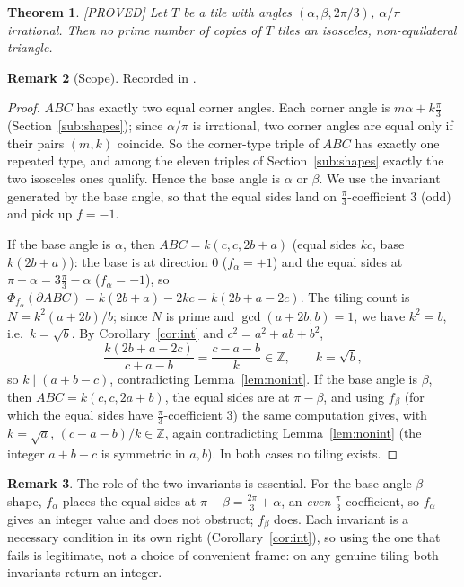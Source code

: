 \documentclass[11pt,reqno]{amsart}
\theoremstyle{plain}
\newtheorem{theorem}{Theorem}
\theoremstyle{definition}
\newtheorem{remark}[theorem]{Remark}
\newcommand{\Z}{\mathbb{Z}}
\newcommand{\lab}[1]{\hfill\textnormal{\footnotesize\textsc{[#1]}}}
\begin{document}
\begin{theorem}\label{thm:iso}\lab{PROVED}
Let $T$ be a tile with angles $(\alpha,\beta,2\pi/3)$, $\alpha/\pi$ irrational. Then no prime number
of copies of $T$ tiles an isosceles, non-equilateral triangle.
\end{theorem}

\begin{remark}[Scope]\label{rem:incomm}
Recorded in \cite{Obstructions}.
\end{remark}

\begin{proof}
$ABC$ has exactly two equal corner angles. Each corner angle is $m\alpha+k\frac\pi3$
(Section~\ref{sub:shapes}); since $\alpha/\pi$ is irrational, two corner angles are equal only if
their pairs $(m,k)$ coincide. So the corner-type triple of $ABC$ has exactly one repeated type, and
among the eleven triples of Section~\ref{sub:shapes} exactly the two isosceles ones qualify. Hence
the base angle is $\alpha$ or $\beta$. We use the invariant generated by the base angle, so that the
equal sides land on $\frac\pi3$-coefficient $3$ (odd) and pick up $f=-1$.

If the base angle is $\alpha$, then $ABC=k(c,c,2b+a)$ (equal sides $kc$, base $k(2b+a)$): the base
is at direction $0$ ($f_\alpha=+1$) and the equal sides at $\pi-\alpha=3\frac\pi3-\alpha$
($f_\alpha=-1$), so $\Phi_{f_\alpha}(\partial ABC)=k(2b+a)-2kc=k(2b+a-2c)$. The tiling count is
$N=k^2(a+2b)/b$; since $N$ is prime and $\gcd(a+2b,b)=1$, we have $k^2=b$, i.e.\ $k=\sqrt b$.
By Corollary~\ref{cor:int} and $c^2=a^2+ab+b^2$,
\[
\frac{k(2b+a-2c)}{c+a-b}=\frac{c-a-b}{k}\in\Z,\qquad k=\sqrt b,
\]
so $k\mid(a+b-c)$, contradicting Lemma~\ref{lem:nonint}. If the base angle is $\beta$, then
$ABC=k(c,c,2a+b)$, the equal sides are at $\pi-\beta$, and using $f_\beta$ (for which the equal
sides have $\frac\pi3$-coefficient $3$) the same computation gives, with $k=\sqrt a$,
$(c-a-b)/k\in\Z$, again contradicting Lemma~\ref{lem:nonint} (the integer $a+b-c$ is symmetric in
$a,b$). In both cases no tiling exists.
\end{proof}

\begin{remark}
The role of the two invariants is essential. For the base-angle-$\beta$ shape, $f_\alpha$ places
the equal sides at $\pi-\beta=\frac{2\pi}3+\alpha$, an \emph{even} $\frac\pi3$-coefficient, so
$f_\alpha$ gives an integer value and does not obstruct; $f_\beta$ does. Each invariant is a
necessary condition in its own right (Corollary~\ref{cor:int}), so using the one that fails is
legitimate, not a choice of convenient frame: on any genuine tiling both invariants return an
integer.
\end{remark}
\end{document}

